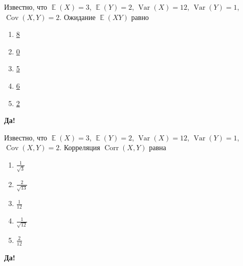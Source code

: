 \documentclass[t]{beamer}
\DeclareMathOperator{\Var}{Var}
\DeclareMathOperator{\Cov}{Cov}
\DeclareMathOperator{\Corr}{Corr}
\DeclareMathOperator{\E}{\mathbb{E}}
\begin{document}
 \begin{frame} \label{11-Yes} 
\begin{block}{11} 

  Известно, что $\E(X)=3$, $\E(Y)=2$, $\Var(X)=12$, $\Var(Y)=1$, $\Cov(X,Y)=2$. Ожидание $\E(XY)$ равно
  


 \end{block} 
\begin{enumerate} 
\item[] \hyperlink{11-Yes}{\beamergotobutton{} 8}
\item[] \hyperlink{11-No}{\beamergotobutton{} 0}
\item[] \hyperlink{11-No}{\beamergotobutton{} 5}
\item[] \hyperlink{11-No}{\beamergotobutton{} 6}
\item[] \hyperlink{11-No}{\beamergotobutton{} 2}
\end{enumerate} 

 \textbf{Да!} 
 \hyperlink{12}{}\end{frame} 


 \begin{frame} \label{12-Yes} 
\begin{block}{12} 

  Известно, что $\E(X)=3$, $\E(Y)=2$, $\Var(X)=12$, $\Var(Y)=1$, $\Cov(X,Y)=2$. Корреляция $\Corr(X,Y)$ равна
  


 \end{block} 
\begin{enumerate} 
\item[] \hyperlink{12-Yes}{\beamergotobutton{} $\frac{1}{\sqrt{3}}$}
\item[] \hyperlink{12-No}{\beamergotobutton{} $\frac{2}{\sqrt{13}}$}
\item[] \hyperlink{12-No}{\beamergotobutton{} $\frac{1}{12}$}
\item[] \hyperlink{12-No}{\beamergotobutton{} $\frac{1}{\sqrt{12}}$}
\item[] \hyperlink{12-No}{\beamergotobutton{} $\frac{2}{12}$}
\end{enumerate} 

 \textbf{Да!} 
 \hyperlink{13}{}\end{frame} 
\end{document}
